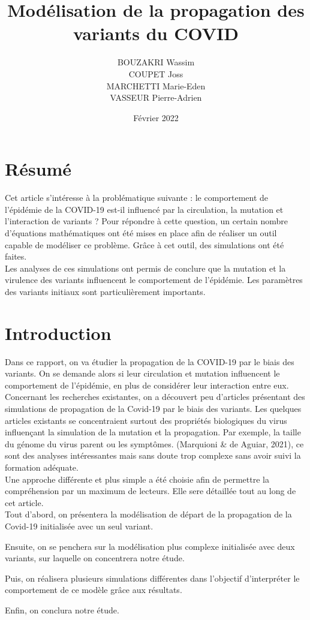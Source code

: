 \documentclass{article}
\title{Modélisation de la propagation des variants du COVID}
\author{BOUZAKRI Wassim \\COUPET Joss \\MARCHETTI Marie-Eden \\VASSEUR Pierre-Adrien}
\date{Février 2022}
\begin{document}
\maketitle

\section{Résumé}

Cet article s'intéresse à la problématique suivante : le comportement de l'épidémie de la COVID-19 est-il influencé par la circulation, la mutation et l'interaction de variants ?
Pour répondre à cette question, un certain nombre d'équations mathématiques ont été mises en place afin de réaliser un outil capable de modéliser ce problème. Grâce à cet outil, des simulations ont été faites. \\
Les analyses de ces simulations ont permis de conclure que la mutation et la virulence des variants influencent le comportement de l'épidémie. Les paramètres des variants initiaux sont particulièrement importants.

\section{Introduction}

Dans ce rapport, on va étudier la propagation de la COVID-19 par le biais des variants.
On se demande alors si leur circulation et mutation influencent le comportement de l'épidémie, en plus de considérer leur interaction entre eux.\\
\noindent
Concernant les recherches existantes, on a découvert peu d'articles présentant des simulations de propagation de la Covid-19 par le biais des variants.
Les quelques articles existants se concentraient surtout des propriétés biologiques du virus influençant la simulation de la mutation et la propagation.
Par exemple, la taille du génome du virus parent ou les symptômes. (Marquioni \& de Aguiar, 2021), ce sont des analyses intéressantes mais sans doute trop complexe sans avoir suivi la formation adéquate.\\
\noindent
Une approche différente et plus simple a été choisie afin de permettre la compréhension par un maximum de lecteurs. Elle sere détaillée tout au long de cet article.\\
\noindent
Tout d'abord, on présentera la modélisation de départ de la propagation de la Covid-19 initialisée avec un seul variant. \par
\noindent
Ensuite, on se penchera sur la modélisation plus complexe initialisée avec deux variants, sur laquelle on concentrera notre étude.\par
\noindent
Puis, on réalisera plusieurs simulations différentes dans l'objectif d'interpréter le comportement de ce modèle grâce aux résultats.\par
\noindent
Enfin, on conclura notre étude.\\
\end{document}
